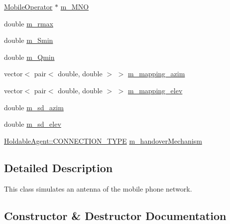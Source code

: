 \begin{DoxyCompactItemize}
\item 
\hyperlink{class_mobile_operator}{Mobile\+Operator} $\ast$ \hyperlink{class_antenna_a775a081edfeefcf293bf3ffb3c19013e}{m\+\_\+\+M\+NO}
\item 
double \hyperlink{class_antenna_a7b8fda5c94e7cf03c14a0fe5447e5d46}{m\+\_\+rmax}
\item 
double \hyperlink{class_antenna_a55c98e1d697184199f908f88ae364886}{m\+\_\+\+Smin}
\item 
double \hyperlink{class_antenna_a8f58c6af021dc13d6d76d390daaf59d7}{m\+\_\+\+Qmin}
\item 
vector$<$ pair$<$ double, double $>$ $>$ \hyperlink{class_antenna_a0d4e25b246a30e3e6fdb303bed85e7da}{m\+\_\+mapping\+\_\+azim}
\item 
vector$<$ pair$<$ double, double $>$ $>$ \hyperlink{class_antenna_a71b55ca74697d064e231829343209fec}{m\+\_\+mapping\+\_\+elev}
\item 
double \hyperlink{class_antenna_af9ed0b78826b52bd60c497eb7f87be3d}{m\+\_\+sd\+\_\+azim}
\item 
double \hyperlink{class_antenna_aeb2ce4a95682b9ecff1395dfa857c089}{m\+\_\+sd\+\_\+elev}
\item 
\hyperlink{class_holdable_agent_ae2c334b004d7b9c5a999cf2618e4e518}{Holdable\+Agent\+::\+C\+O\+N\+N\+E\+C\+T\+I\+O\+N\+\_\+\+T\+Y\+PE} \hyperlink{class_antenna_a4fa1f72704f7a10fa54498b839c76833}{m\+\_\+handover\+Mechanism}
\end{DoxyCompactItemize}


\subsection{Detailed Description}
This class simulates an antenna of the mobile phone network. 

\subsection{Constructor \& Destructor Documentation}
\mbox{\label{class_antenna_a39c505109145908a5b032a16a2fe53c4}} 
